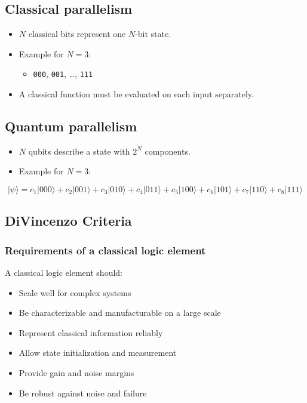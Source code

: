 \documentclass[
]{article}
\providecommand{\tightlist}{%
  \setlength{\itemsep}{0pt}\setlength{\parskip}{0pt}}
\begin{document}
\subsection{Classical parallelism}\label{classical-parallelism}

\begin{itemize}
\tightlist
\item
  $N$ classical bits represent one $N$-bit state.
\item
  Example for $N = 3$:

  \begin{itemize}
  \tightlist
  \item
    \texttt{000}, \texttt{001}, \ldots, \texttt{111}
  \end{itemize}
\item
  A classical function must be evaluated on each input separately.
\end{itemize}

\subsection{Quantum parallelism}\label{quantum-parallelism}

\begin{itemize}
\tightlist
\item
  $N$ qubits describe a state with $2^N$ components.
\item
  Example for $N = 3$:
\end{itemize}

\[
|\psi\rangle = c_1|000\rangle + c_2|001\rangle + c_3|010\rangle + c_4|011\rangle + c_5|100\rangle + c_6|101\rangle + c_7|110\rangle + c_8|111\rangle
\]

\subsection{DiVincenzo Criteria}\label{divincenzo-criteria}

\subsubsection{Requirements of a classical logic
element}\label{requirements-of-a-classical-logic-element}

A classical logic element should:

\begin{itemize}
\tightlist
\item
  Scale well for complex systems
\item
  Be characterizable and manufacturable on a large scale
\item
  Represent classical information reliably
\item
  Allow state initialization and measurement
\item
  Provide gain and noise margins
\item
  Be robust against noise and failure
\end{itemize}
\end{document}
